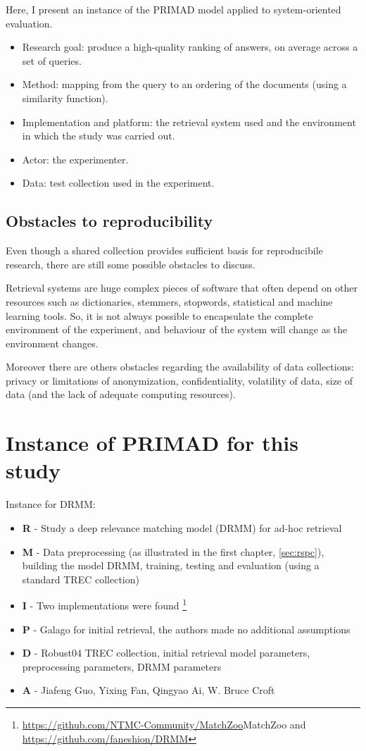 Here, I present an instance of the PRIMAD model applied to system-oriented evaluation.

\begin{itemize}
\item Research goal: produce a high-quality ranking of answers, on average across a set of queries.
\item Method: mapping from the query to an ordering of the documents (using a similarity function).
\item Implementation and platform: the retrieval system used and the environment in which the study was carried out.
\item Actor: the experimenter.
\item Data: test collection used in the experiment.
\end{itemize}

\subsection{Obstacles to reproducibility}

Even though a shared collection provides sufficient basis for reproducibile research, there are still some possible obstacles to discuss.

Retrieval systems are huge complex pieces of software that often depend on other resources such as dictionaries, stemmers, stopwords, statistical and machine learning tools. So, it is not always possible to encapsulate the complete environment of the experiment, and behaviour of the system will change as the environment changes.

Moreover there are others obstacles regarding the availability of data collections: privacy or limitations of anonymization, confidentiality, volatility of data, size of data (and the lack of adequate computing resources).

\section{Instance of PRIMAD for this study}

Instance for DRMM:

\begin{itemize}
\item \textbf{R} - Study a deep relevance matching model (DRMM) for ad-hoc retrieval
\item \textbf{M} - Data preprocessing (as illustrated in the first chapter, \ref{sec:rspc}), building the model DRMM, training, testing and evaluation (using a standard TREC collection)
\item \textbf{I} - Two implementations were found \footnote{\url{https://github.com/NTMC-Community/MatchZoo}{MatchZoo} \cite{matchzoo} and \url{https://github.com/faneshion/DRMM}}
\item \textbf{P} - Galago for initial retrieval, the authors made no additional assumptions
\item \textbf{D} - Robust04 TREC collection, initial retrieval model parameters, preprocessing parameters, DRMM parameters
\item \textbf{A} - Jiafeng Guo, Yixing Fan, Qingyao Ai, W. Bruce Croft
\end{itemize}

